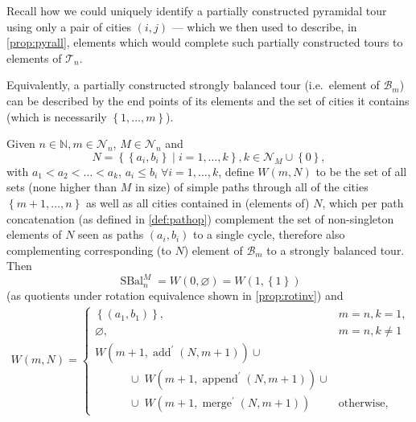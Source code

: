 \documentclass[titlepage,twoside,index=totoc,bibliography=totoc]{scrartcl}
\newcommand{\annotation}[1]{\marginpar{\small\itshape\color{green}#1}}
\numberwithin{equation}{section}
\numberwithin{figure}{section}
\numberwithin{table}{section}
\begin{document}
Recall how we could uniquely identify a partially constructed pyramidal
tour using only a pair of cities $(i,j)$ --- which we then used to
describe, in \cref{prop:pyrall}, elements which would complete such
partially constructed tours to elements of $\mathcal{T}_n$.

Equivalently, a partially constructed strongly balanced tour (i.e.\ element
of $\mathcal{B}_m$) can be described by the end points of its elements and
the set of cities it contains (which is necessarily $\left\{1,\ldots,m\right\}$).

\begin{proposition}
\label{prop:sball}
  Given $n \in \mathbb{N}, m \in \mathcal{N}_n$, $M \in \mathcal{N}_n$
  and
  \[
    N = \left\{\left\{a_i,b_i\right\} \mid i = 1,\ldots,k \right\}, k \in \mathcal{N}_M \cup \left\{0\right\},
  \]
  with $a_1 < a_2 < \ldots < a_k$, $a_i \leq b_i \; \forall i = 1,\ldots,k$,
  define $W\left(m,N\right)$ to be the set of
  all sets (none higher than $M$ in size)
  of simple paths through all of the cities $\left\{m+1,\ldots,n\right\}$
  as well as all cities contained in (elements of) $N$,
  which per path concatenation (as defined in \cref{def:pathop})
  complement the set of
  non-singleton elements of $N$ seen as paths $(a_i,b_i)$ to a single cycle,
  therefore also complementing corresponding (to $N$\!) element of $\mathcal{B}_m$
  to a strongly balanced tour.
  Then
  \[
    \operatorname{SBal}_n^M =
    W\left(0,\varnothing\right) =
      W\left(1,\left\{1\right\}\right)
  \]
  (as quotients under rotation equivalence shown in \cref{prop:rotinv}) and
  \begin{align}
    \label{eq:sbdp}
    W\left(m,N\right) =
    \begin{cases}
      \left\{(a_1,b_1)\right\}, & m = n, k = 1, \\
      \varnothing, & m = n, k \neq 1 \\
      W\left(m+1,\operatorname{add}^\prime\left(N,m+1\right)\right) \cup
      \\ \quad \quad \quad
      \cup\;  W\left(m+1,\operatorname{append}^\prime\left(N,m+1\right)\right) \cup
      \\ \quad \quad \quad
      \cup\; W\left(m+1,\operatorname{merge}^\prime\left(N,m+1\right)\right) & \text{otherwise},
    \end{cases}
  \end{align}

\end{proposition}
\end{document}
